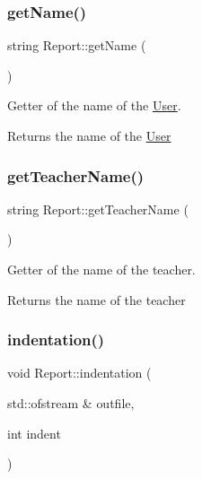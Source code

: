 \subsubsection{\texorpdfstring{get\+Name()}{getName()}}
{\footnotesize\ttfamily string Report\+::get\+Name (\begin{DoxyParamCaption}{ }\end{DoxyParamCaption})}



Getter of the name of the \mbox{\hyperlink{class_user}{User}}. 

\begin{DoxyReturn}{Returns}
the name of the \mbox{\hyperlink{class_user}{User}} 
\end{DoxyReturn}
\mbox{\label{class_report_af7c52b70f5fe6feae64e44affa6095cd}} 
\subsubsection{\texorpdfstring{get\+Teacher\+Name()}{getTeacherName()}}
{\footnotesize\ttfamily string Report\+::get\+Teacher\+Name (\begin{DoxyParamCaption}{ }\end{DoxyParamCaption})}



Getter of the name of the teacher. 

\begin{DoxyReturn}{Returns}
the name of the teacher 
\end{DoxyReturn}
\mbox{\label{class_report_a67a10004cf149f202015d55a14efe6c1}} 
\subsubsection{\texorpdfstring{indentation()}{indentation()}}
{\footnotesize\ttfamily void Report\+::indentation (\begin{DoxyParamCaption}\item[{std\+::ofstream \&}]{outfile,  }\item[{int}]{indent }\end{DoxyParamCaption})}




